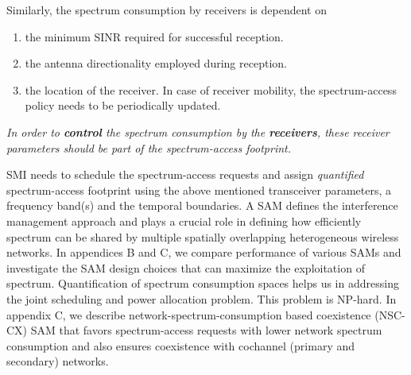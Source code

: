 \documentclass[journal,12pt,draftclsnofoot,onecolumn]{IEEEtran}
\begin{document}
Similarly, the spectrum consumption by receivers is dependent on
\begin{enumerate}
	\item the minimum SINR required for successful reception.
	\item the antenna directionality employed during reception.
	\item the location of the receiver. In case of receiver mobility, the spectrum-access policy needs to be periodically updated.
\end{enumerate}
\textit{In order to \textbf{control} the spectrum consumption by the \textbf{receivers}, these receiver parameters should be part of the spectrum-access footprint.}

SMI needs to schedule the spectrum-access requests and assign \textit{quantified} spectrum-access footprint using the above mentioned transceiver parameters, a frequency band(s) and the temporal boundaries. A SAM defines the interference management approach and plays a crucial role in defining how efficiently spectrum can be shared by multiple spatially overlapping heterogeneous wireless networks. In appendices B and C, we compare performance of various SAMs and investigate the SAM design choices that can maximize the exploitation of spectrum. 
Quantification of spectrum consumption spaces helps us in addressing the joint scheduling and power allocation problem. This problem is NP-hard. In appendix C, we describe network-spectrum-consumption based coexistence (NSC-CX) SAM that favors spectrum-access requests with lower network spectrum consumption and also ensures coexistence with cochannel (primary and secondary) networks.
\end{document}
